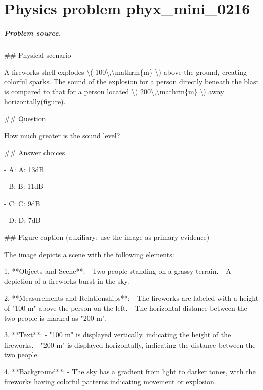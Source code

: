 
\chapter{Physics problem phyx\_mini\_0216}
\label{ch:PhyXMiniProblems_problem_phyx_mini_0216}

\paragraph{Problem source.}
\#\# Physical scenario

A fireworks shell explodes \textbackslash{}( 100\textbackslash{},\textbackslash{}mathrm\{m\} \textbackslash{}) above the ground, creating colorful sparks. The sound of the explosion for a person directly beneath the blast is compared to that for a person located \textbackslash{}( 200\textbackslash{},\textbackslash{}mathrm\{m\} \textbackslash{}) away horizontally(figure).

\#\# Question

How much greater is the sound level?

\#\# Answer choices

- A: A: 13dB

- B: B: 11dB

- C: C: 9dB

- D: D: 7dB

\#\# Figure caption (auxiliary; use the image as primary evidence)

The image depicts a scene with the following elements:

1. **Objects and Scene**:
   - Two people standing on a grassy terrain.
   - A depiction of a fireworks burst in the sky.
   
2. **Measurements and Relationships**:
   - The fireworks are labeled with a height of "100 m" above the person on the left.
   - The horizontal distance between the two people is marked as "200 m".
   
3. **Text**:
   - "100 m" is displayed vertically, indicating the height of the fireworks.
   - "200 m" is displayed horizontally, indicating the distance between the two people.

4. **Background**:
   - The sky has a gradient from light to darker tones, with the fireworks having colorful patterns indicating movement or explosion.

